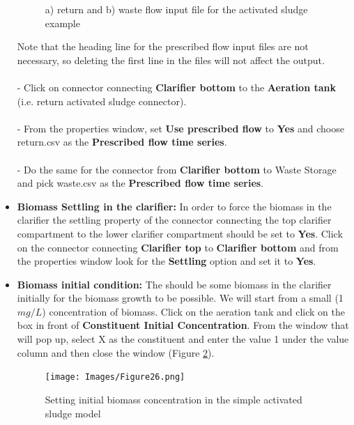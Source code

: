 \begin{itemize}
\begin{figure}
\begin{center}
\caption{a) return and b) waste flow input file for the activated sludge example}\label{fig:24}
\end{center}
\end{figure}
Note that the heading line for the prescribed flow input files are not necessary, so deleting the first line in the files will not affect the output. \\\\
- Click on connector connecting \textbf{Clarifier bottom} to the \textbf{Aeration tank} (i.e. return activated sludge connector). \\\\
- From the properties window, set \textbf{Use prescribed flow} to \textbf{Yes} and choose return.csv as the \textbf{Prescribed flow time series}. \\\\
- Do the same for the connector from \textbf{Clarifier bottom} to {Waste Storage} and pick waste.csv as the \textbf{Prescribed flow time series}. \\
\item \textbf{Biomass Settling in the clarifier: } In order to force the biomass in the clarifier the settling property of the connector connecting the top clarifier compartment to the lower clarifier compartment should be set to \textbf{Yes}. Click on the connector connecting \textbf{Clarifier top} to \textbf{Clarifier bottom} and from the properties window look for the \textbf{Settling} option and set it to \textbf{Yes}. 
\item \textbf{Biomass initial condition: } The should be some biomass in the clarifier initially for the biomass growth to be possible. We will start from a small (1$mg/L$) concentration of biomass. Click on the aeration tank and click on the box in front of \textbf{Constituent Initial Concentration}. From the window that will pop up, select X as the constituent and enter the value 1 under the value column and then close the window (Figure \ref{fig:26}). 
\begin{figure}
\begin{center}
\texttt{[image: Images/Figure26.png]} \\
\caption{Setting initial biomass concentration in the simple activated sludge model}\label{fig:26} 
\end{center}
\end{figure}


\end{itemize}
